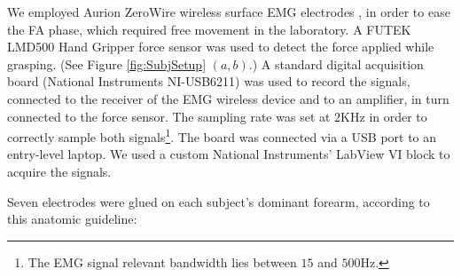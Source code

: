 \documentclass[10pt]{bmc_article}
\def\texttt{[image: ]}
\newenvironment{bmcformat}
  {\begin{raggedright}\baselineskip20pt\sloppy\setboolean{publ}{false}}
  {\end{raggedright}\baselineskip20pt\sloppy}
\begin{document}
\begin{bmcformat}

We employed Aurion ZeroWire wireless surface EMG
electrodes \cite{zerowire}, in order to ease the FA
phase, which required free movement in the laboratory. A FUTEK LMD500
Hand Gripper force sensor \cite{LMD500} was used to detect the
force applied while grasping. (See Figure \ref{fig:SubjSetup} $(a,b)$.)
A standard digital acquisition board
(National Instruments NI-USB6211) was used to record the signals,
connected to the receiver of the EMG wireless device and to an
amplifier, in turn connected to the force sensor. The sampling rate was set at
$2$KHz in order to correctly sample both signals\footnote{The EMG signal
relevant bandwidth lies between $15$ and $500$Hz.}. The board was connected via a
USB port to an entry-level laptop. We used a custom National
Instruments' LabView VI block to acquire the signals.


Seven electrodes were glued on each subject's dominant
forearm, according to this anatomic guideline:

\begin{itemize}


\end{itemize}
\end{bmcformat}
\end{document}
